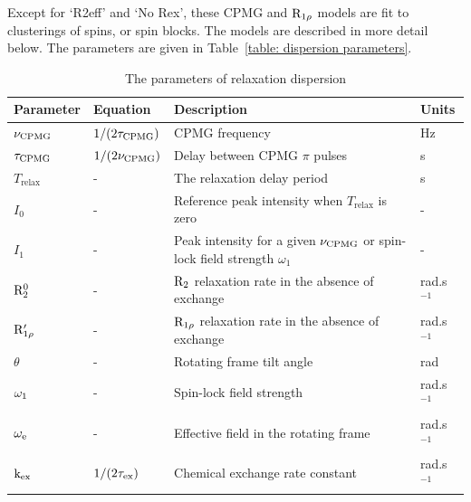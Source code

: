 Except for `R2eff' and `No Rex', these CPMG and $\mathrm{R}_{1\rho}$ models are fit to clusterings of spins, or spin blocks.  The models are described in more detail below.  The parameters are given in Table~\ref{table: dispersion parameters}.

\begin{table}
\begin{center}
\caption{The parameters of relaxation dispersion}
\begin{tabular}{llll}
\toprule
Parameter               & Equation              & Description                                                                   & Units \\
\midrule
$\nu_\textrm{CPMG}$               & $1 / (2 \tau_\textrm{CPMG})$    & CPMG frequency                                                                & Hz \\
$\tau_\textrm{CPMG}$              & $1 / (2 \nu_\textrm{CPMG})$     & Delay between CPMG $\pi$ pulses                                               & s \\
$T_\textrm{relax}$      & -                     & The relaxation delay period                                                   & s \\
$I_0$                   & -                     & Reference peak intensity when $T_\textrm{relax}$ is zero                      & - \\
$I_1$                   & -                     & Peak intensity for a given $\nu_\textrm{CPMG}$ or spin-lock field strength $\omega_1$   & - \\
$\mathrm{R}_2^0$             & -                     & $\mathrm{R}_2$ relaxation rate in the absence of exchange                            & rad.s$^{-1}$ \\
$\mathrm{R}_{1\rho}'$         & -                     & $\mathrm{R}_{1\rho}$ relaxation rate in the absence of exchange                         & rad.s$^{-1}$ \\
$\theta$                & -                     & Rotating frame tilt angle                                                     & rad \\
$\omega_1$             & -                     & Spin-lock field strength                                                      & rad.s$^{-1}$ \\
$\omega_\textrm{e}$               & -                     & Effective field in the rotating frame                                         & rad.s$^{-1}$ \\
$\textrm{k}_\textrm{ex}$                  & $1 / (2 \tau_\textrm{ex})$        & Chemical exchange rate constant                                               & rad.s$^{-1}$ \\

\end{tabular}
\end{center}
\end{table}
